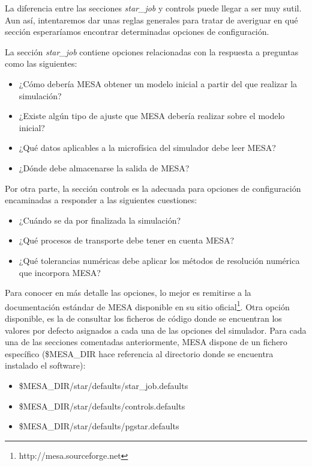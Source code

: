La diferencia entre las secciones \textit{star\_job} y controls puede llegar a ser muy sutil. Aun así, intentaremos dar unas reglas generales para tratar de averiguar en qué sección esperaríamos encontrar determinadas opciones de configuración.

La sección \textit{star\_job} contiene opciones relacionadas con la respuesta a preguntas como las siguientes:
\begin{itemize}
    \item ¿Cómo debería MESA obtener un modelo inicial a partir del que realizar la simulación?
    \item ¿Existe algún tipo de ajuste que MESA debería realizar sobre el modelo inicial?
    \item ¿Qué datos aplicables a la microfísica del simulador debe leer MESA?
    \item ¿Dónde debe almacenarse la salida de MESA?
\end{itemize}

Por otra parte, la sección controls es la adecuada para opciones de configuración encaminadas a responder a las siguientes cuestiones:
\begin{itemize}
    \item ¿Cuándo se da por finalizada la simulación?
    \item ¿Qué procesos de transporte debe tener en cuenta MESA?
    \item ¿Qué tolerancias numéricas debe aplicar los métodos de resolución numérica que incorpora MESA?
\end{itemize}

Para conocer en más detalle las opciones, lo mejor es remitirse a la documentación estándar de MESA disponible en su sitio oficial\footnote{http://mesa.sourceforge.net}. Otra opción disponible, es la de consultar los ficheros de código donde se encuentran los valores por defecto asignados a cada una de las opciones del simulador. Para cada una de las secciones comentadas anteriormente, MESA dispone de un fichero específico (\$MESA\_DIR hace referencia al directorio donde se encuentra instalado el software):
\begin{itemize}
    \item \$MESA\_DIR/star/defaults/star\_job.defaults
    \item \$MESA\_DIR/star/defaults/controls.defaults
    \item \$MESA\_DIR/star/defaults/pgstar.defaults
\end{itemize}


